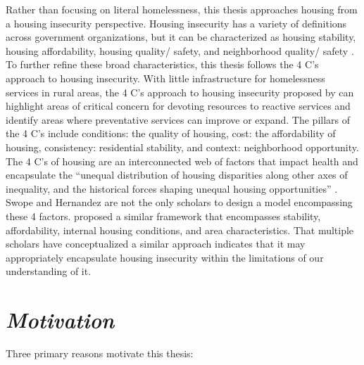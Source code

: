 Rather than focusing on literal homelessness, this thesis approaches housing from a housing insecurity perspective. Housing insecurity has a variety of definitions across government organizations, but it can be characterized as housing stability, housing affordability, housing quality/ safety, and neighborhood quality/ safety \citep{cox_road_2019}. To further refine these broad characteristics, this thesis follows the 4 C's approach to housing insecurity. With little infrastructure for homelessness services in rural areas, the 4 C’s approach to housing insecurity proposed by \citet{hernandez_housing_2019} can highlight areas of critical concern for devoting resources to reactive services and identify areas where preventative services can improve or expand. The pillars of the 4 C's include conditions: the quality of housing, cost: the affordability of housing, consistency: residential stability, and context: neighborhood opportunity. The 4 C’s of housing are an interconnected web of factors that impact health and encapsulate the “unequal distribution of housing disparities along other axes of inequality, and the historical forces shaping unequal housing opportunities” \citep[1]{hernandez_housing_2019}.  Swope and Hernandez are not the only scholars to design a model encompassing these 4 factors. \citet{metzger_fair_2017} proposed a similar framework that encompasses stability, affordability, internal housing conditions, and area characteristics. That multiple scholars have conceptualized a similar approach indicates that it may appropriately encapsulate housing insecurity within the limitations of our understanding of it. 

\section{\textit{Motivation}}
Three primary reasons motivate this thesis:

